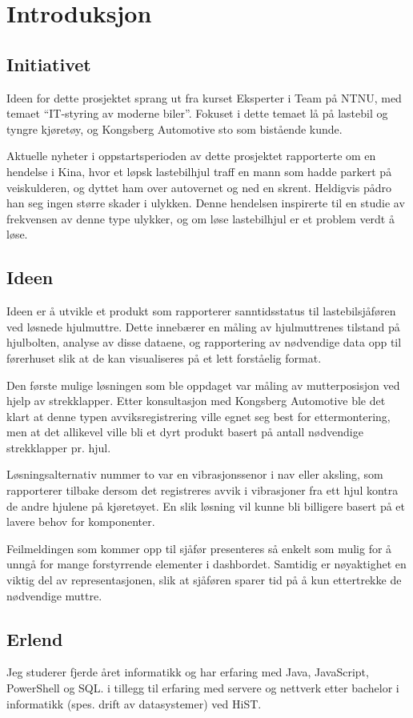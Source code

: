 \chapter{Introduksjon}
\section{Initiativet}
Ideen for dette prosjektet sprang ut fra kurset Eksperter i Team på NTNU, med 
temaet ``IT-styring av moderne biler''. Fokuset i dette temaet lå på lastebil 
og tyngre kjøretøy, og Kongsberg Automotive sto som bistående kunde.

Aktuelle nyheter i oppstartsperioden av dette prosjektet rapporterte om en 
hendelse i Kina, hvor et løpsk lastebilhjul traff en mann som hadde parkert på 
veiskulderen, og dyttet ham over autovernet og ned en skrent. Heldigvis pådro 
han seg ingen større skader i ulykken. Denne hendelsen inspirerte til en studie 
av frekvensen av denne type ulykker, og om løse lastebilhjul er et problem 
verdt å løse.

\section{Ideen}
Ideen er å utvikle et produkt som rapporterer sanntidsstatus til lastebilsjåføren 
ved løsnede hjulmuttre. Dette innebærer en måling av hjulmuttrenes tilstand på 
hjulbolten, analyse av disse dataene, og rapportering av nødvendige data 
opp til førerhuset slik at de kan visualiseres på et lett forståelig format.

Den første mulige løsningen som ble oppdaget var måling av mutterposisjon ved 
hjelp av strekklapper. Etter konsultasjon med Kongsberg Automotive ble det klart 
at denne typen avviksregistrering ville egnet seg best for ettermontering, 
men at det allikevel ville bli et dyrt produkt basert på antall nødvendige 
strekklapper pr. hjul. 

Løsningsalternativ nummer to var en vibrasjonssenor i nav eller aksling, som 
rapporterer tilbake dersom det registreres avvik i vibrasjoner fra ett hjul 
kontra de andre hjulene på kjøretøyet. En slik løsning vil kunne bli billigere 
basert på et lavere behov for komponenter.

Feilmeldingen som kommer opp til sjåfør presenteres så enkelt som mulig for å unngå for mange forstyrrende elementer i dashbordet. Samtidig er nøyaktighet en viktig del av representasjonen, slik at sjåføren sparer tid på å kun ettertrekke de nødvendige muttre.
\section{Erlend}
Jeg studerer fjerde året informatikk og har erfaring med Java, JavaScript, PowerShell og SQL. i tillegg til erfaring med servere og nettverk etter bachelor i informatikk (spes. drift av datasystemer) ved HiST. 